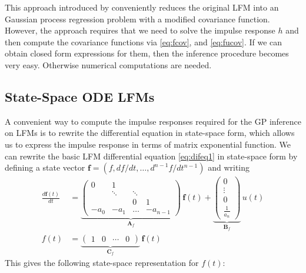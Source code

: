 \documentclass[journal]{IEEEtran}
\begin{document}
This approach introduced by
\cite{Alvarez+Luengo+Lawrence:2009,Alvarez+Luengo+Lawrence:2013} conveniently
reduces the original LFM into an Gaussian process regression problem
with a modified covariance function. However, the approach requires
that we need to solve the impulse response $h$ and then compute the
covariance functions via \eqref{eq:fcov}, and \eqref{eq:fucov}.  If we can obtain closed form
expressions for them, then the inference procedure becomes very
easy. Otherwise numerical computations are needed.

\subsection{State-Space ODE LFMs} \label{sec:ss_de_lfms}
%
A convenient way to compute the impulse responses required for the GP inference on LFMs is to rewrite the differential equation in state-space form, which allows us to express the impulse response in terms of matrix exponential function. We can rewrite the basic LFM differential equation \eqref{eq:difeq1} in state-space form \cite{Hartikainen+Sarkka:2011,Hartikainen+Seppanen+Sarkka:2012} by defining a state vector $\mathbf{f} = (f, df/dt,\ldots,d^{n-1}f/dt^{n-1})$ and writing
%
\begin{equation}
\begin{split}
  \frac{d\mathbf{f}(t)}{dt}
  &= \underbrace{\begin{pmatrix}
       0             & 1      &        &       \\
                     & \ddots & \ddots &       \\
                     &         &  0    &     1 \\
   -a_0 & -a_1 & \hdots &  -a_{n-1}
  \end{pmatrix}}_{\mathbf{A}_f} \, \mathbf{f}(t)
  + \underbrace{\begin{pmatrix}
      0 \\
      \vdots \\
      0 \\
      \frac{1}{a_n}
  \end{pmatrix}}_{\mathbf{B}_f} \,
   u(t) \\
   f(t) &= \underbrace{\begin{pmatrix}
     1 & 0 & \cdots & 0
   \end{pmatrix}}_{\mathbf{C}_f} \, \mathbf{f}(t)
\end{split}
\label{eq:ss1}
\end{equation}
%
This gives the following state-space representation for $f(t)$:
\end{document}

